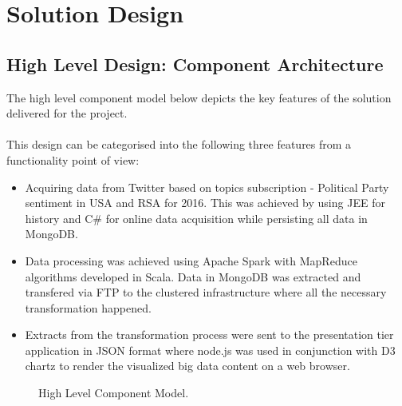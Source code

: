 \documentclass[12pt]{article} %
\begin{document}
	
	
	\section{Solution Design}
		
	\subsection{High Level Design: Component Architecture}
	The high level component model below depicts the key features of the solution delivered for the project.
	\\
	\\
	This design can be categorised into the following three features from a functionality point of view:
	
		\begin{itemize}
			\item Acquiring data from Twitter based on topics subscription - Political Party sentiment in USA and RSA for 2016. This was achieved by using JEE for history and C\# for online data acquisition while persisting all data in MongoDB.
			\item Data processing was achieved using Apache Spark with MapReduce algorithms developed in Scala. Data in MongoDB was extracted and transfered via FTP to the clustered infrastructure where all the necessary transformation happened.
			\item Extracts from the transformation process were sent to the presentation tier application in JSON format where node.js was used in conjunction with D3 chartz to render the visualized big data content on a web browser.
		\end{itemize}
	
	
		\begin{figure}[H] %
			\caption{High Level Component Model.}
			\label{fig:speciation}
		\end{figure}
	
\end{document}
